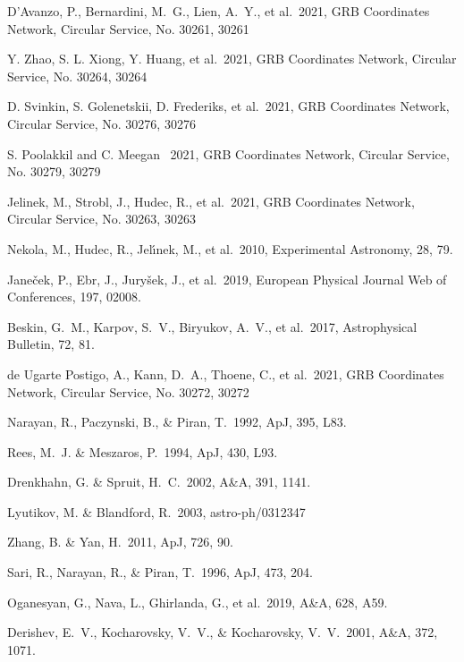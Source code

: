 \documentclass{naturesubmissionstyle}
\newcommand\aap{A\&A}                %
\newcommand\apj{ApJ}                 %
\newcommand\apjl{ApJ}                %
\begin{document}
\begin{thebibliography}{10} 

 D'Avanzo, P., Bernardini, M.~G., Lien, A.~Y., et al.\ 2021, GRB Coordinates Network, Circular Service, No. 30261, 30261

 Y. Zhao, S. L. Xiong, Y. Huang, et al.\ 2021, GRB Coordinates Network, Circular Service, No. 30264, 30264

 D. Svinkin, S. Golenetskii, D. Frederiks, et al.\ 2021, GRB Coordinates Network, Circular Service, No. 30276, 30276

 S. Poolakkil and C. Meegan \ 2021, GRB Coordinates Network, Circular Service, No.  30279,  30279


 Jelinek, M., Strobl, J., Hudec, R., et al.\ 2021, GRB Coordinates Network, Circular Service, No. 30263, 30263

 Nekola, M., Hudec, R., Jel{\'\i}nek, M., et al.\ 2010, Experimental Astronomy, 28, 79.

 Jane{\v{c}}ek, P., Ebr, J., Jury{\v{s}}ek, J., et al.\ 2019, European Physical Journal Web of Conferences, 197, 02008. 

 Beskin, G.~M., Karpov, S.~V., Biryukov, A.~V., et al.\ 2017, Astrophysical Bulletin, 72, 81.


 de Ugarte Postigo, A., Kann, D.~A., Thoene, C., et al.\ 2021, GRB Coordinates Network, Circular Service, No. 30272, 30272

 Narayan, R., Paczynski, B., \& Piran, T.\ 1992, \apjl, 395, L83. 

 Rees, M.~J. \& Meszaros, P.\ 1994, \apjl, 430, L93. 

 Drenkhahn, G. \& Spruit, H.~C.\ 2002, \aap, 391, 1141. 

 Lyutikov, M. \& Blandford, R.\ 2003, astro-ph/0312347

 Zhang, B. \& Yan, H.\ 2011, \apj, 726, 90. 

 Sari, R., Narayan, R., \& Piran, T.\ 1996, \apj, 473, 204. 

 Oganesyan, G., Nava, L., Ghirlanda, G., et al.\ 2019, \aap, 628, A59. 


 Derishev, E.~V., Kocharovsky, V.~V., \& Kocharovsky, V.~V.\ 2001, \aap, 372, 1071. 


\end{thebibliography}
\end{document}
